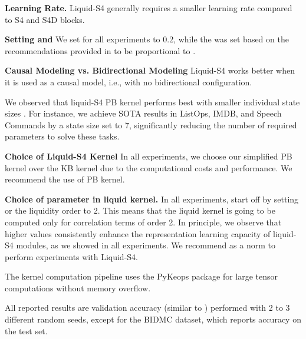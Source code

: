 \documentclass{MITcsail}
\begin{document}
\textbf{Learning Rate.} Liquid-S4 generally requires a smaller learning rate compared to S4 and S4D blocks.

\noindent \textbf{Setting  and } We set  for all experiments to 0.2, while the  was set based on the recommendations provided in \citep{gu2022train} to be proportional to .

\noindent \textbf{Causal Modeling vs. Bidirectional Modeling} Liquid-S4 works better when it is used as a causal model, i.e., with no bidirectional configuration.

\noindent \textbf{} We observed that liquid-S4 PB kernel performs best with smaller individual state sizes . For instance, we achieve SOTA results in ListOps, IMDB, and Speech Commands by a state size set to 7, significantly reducing the number of required parameters to solve these tasks.

\noindent \textbf{Choice of Liquid-S4 Kernel} In all experiments, we choose our simplified PB kernel over the KB kernel due to the computational costs and performance. We recommend the use of PB kernel. 

\noindent  \textbf{Choice of parameter  in liquid kernel.} In all experiments, start off by setting  or the liquidity order to 2. This means that the liquid kernel is going to be computed only for correlation terms of order 2. In principle, we observe that higher  values consistently enhance the representation learning capacity of liquid-S4 modules, as we showed in all experiments. We recommend  as a norm to perform experiments with Liquid-S4.

\noindent The kernel computation pipeline uses the PyKeops package \citep{JMLR:v22:20-275} for large tensor computations without memory overflow. 

\noindent All reported results are validation accuracy (similar to \citet{gu2022efficiently}) performed with 2 to 3 different random seeds, except for the BIDMC dataset, which reports accuracy on the test set.
\end{document}
